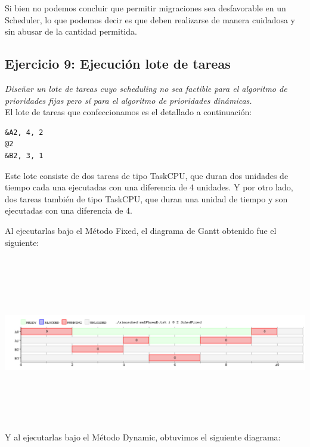 \documentclass[a4paper]{article}
\begin{document}
 Si bien no podemos concluir que permitir migraciones sea desfavorable en un Scheduler, lo que podemos decir es que deben realizarse de manera cuidadosa y sin abusar de la cantidad permitida. 
 
\newpage
 \subsection{Ejercicio 9:  Ejecuci\'on lote de tareas}
\textit{Dise\~nar un lote de tareas cuyo scheduling no sea factible para el algoritmo de prioridades fijas pero s\'i para el algoritmo de prioridades din\'amicas.}\\

El lote de tareas que confeccionamos es el detallado a continuaci\'on:

	\begin{codesnippet}
	\begin{verbatim}
&A2, 4, 2
@2
&B2, 3, 1
	\end{verbatim}
	\end{codesnippet}

Este lote consiste de dos tareas de tipo TaskCPU, que duran dos unidades de tiempo cada una ejecutadas con una diferencia de 4 unidades. Y por otro lado, dos tareas tambi\'en de tipo TaskCPU, que duran una unidad de tiempo y son ejecutadas con una diferencia de 4.\\

\bigskip

Al ejecutarlas bajo el M\'etodo Fixed, el diagrama de Gantt obtenido fue el siguiente:

\includegraphics[width=\textwidth,height=3.0in,keepaspectratio]{imagenes/ej9/fixed.png} 
\bigskip
Y al ejecutarlas bajo el M\'etodo Dynamic, obtuvimos el siguiente diagrama:
\end{document}
